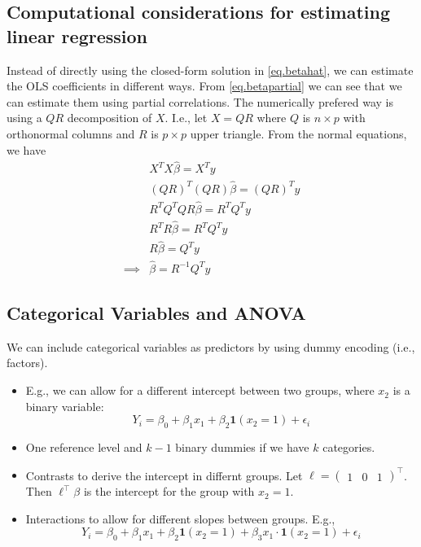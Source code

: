 \documentclass[11pt, %
	oneside, %
	english, %
	onehalfspacing, %
	]{article} %
\numberwithin{equation}{section}
\begin{document}
\subsection{Computational considerations for estimating linear regression}


Instead of directly using the closed-form solution in \eqref{eq.betahat}, we can estimate the OLS coefficients in different ways. From \eqref{eq.betapartial} we can see that we can estimate them using partial correlations. The numerically prefered way is using a $QR$ decomposition of $X$. I.e., let $X = QR$ where $Q$ is $n \times p$ with orthonormal columns and $R$ is $p \times p$ upper triangle. From the normal equations, we have
\begin{equation*}
    \begin{aligned}
        & X^T X \hat{\beta}=X^T y \\
        & (Q R)^T(Q R) \hat{\beta}=(Q R)^T y \\
        & R^T Q^T Q R \hat{\beta}=R^T Q^T y \\
        & R^T R \hat{\beta}=R^T Q^T y \\
        & R \hat{\beta}=Q^T y \\
        \implies &\hat{\beta}=R^{-1} Q^T y
    \end{aligned}
\end{equation*}




\subsection{Categorical Variables and ANOVA}

We can include categorical variables as predictors by using dummy encoding (i.e., factors).
\begin{itemize}
    \item E.g., we can allow for a different intercept between two groups, where $x_2$ is a binary variable:
    \begin{equation*}
        Y_i = \beta_0  + \beta_1 x_1 + \beta_2 \mathbf{1} (x_2 = 1)+ \epsilon_i
    \end{equation*}
    \item One reference level and $k-1$ binary dummies if we have $k$ categories.

    \item Contrasts to derive the intercept in differnt groups. Let $\ell = \begin{pmatrix}
        1 & 0& 1
    \end{pmatrix}^\top$. Then $\ell^\top \beta$ is the intercept for the group with $x_2 = 1$.
    \item Interactions to allow for different slopes between groups. E.g.,
    \begin{equation*}
        Y_i = \beta_0  + \beta_1 x_1 + \beta_2 \mathbf{1} (x_2 = 1)+ \beta_3 x_1 \cdot\mathbf{1} (x_2 = 1) + \epsilon_i
    \end{equation*}
\end{itemize}
\end{document}
